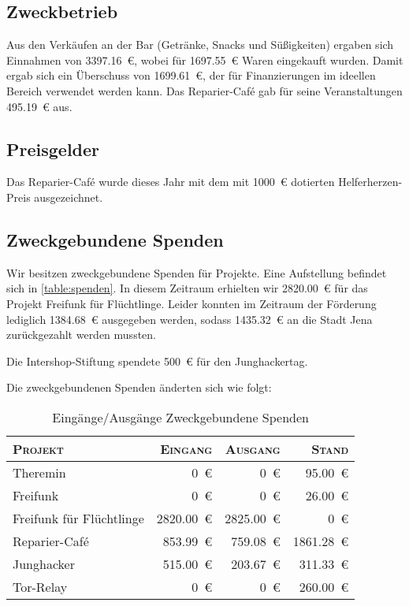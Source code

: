\documentclass[ngerman]{scrartcl}
\begin{document}
\subsection{Zweckbetrieb}
\label{sec:Zweckbetrieb}
Aus den Verkäufen an der Bar (Getränke, Snacks und Süßigkeiten) ergaben sich Einnahmen von \num{3397,16}~\euro{}, wobei für \num{1697,55}~\euro{} Waren eingekauft wurden.
Damit ergab sich ein Überschuss von \num{1699,61}~\euro{}, der für Finanzierungen im ideellen Bereich verwendet werden kann.
Das Reparier-Café gab für seine Veranstaltungen \num{495,19}~\euro{} aus.


\subsection{Preisgelder}
\label{sec:preisgelder}

Das Reparier-Café wurde dieses Jahr mit dem mit \num{1000}~\euro{} dotierten Helferherzen-Preis ausgezeichnet.

\subsection{Zweckgebundene Spenden}
\label{sec:zweckgebundene_spenden}
Wir besitzen zweckgebundene Spenden für Projekte. Eine Aufstellung befindet sich in \autoref{table:spenden}.
In diesem Zeitraum erhielten wir \num{2820,00}~\euro{} für das Projekt Freifunk für Flüchtlinge.
Leider konnten im Zeitraum der Förderung lediglich \num{1384,68}~\euro{} ausgegeben werden,
sodass \num{1435,32}~\euro{} an die Stadt Jena zurückgezahlt werden mussten.

Die Intershop-Stiftung spendete \num{500}~\euro{} für den Junghackertag.

Die zweckgebundenen Spenden änderten sich wie folgt:

\begin{table}[h]
	\centering
	\begin{tabular}{l|r|r|r}
	\toprule
	\textsc{Projekt} & \textsc{Eingang} & \textsc{Ausgang} & \textsc{Stand} \\
	\midrule
	Theremin & \num{0}~\euro{} & \num{0}~\euro{} & \num{95,00}~\euro{} \\
	Freifunk & \num{0}~\euro{} & \num{0}~\euro{} & \num{26,00}~\euro{} \\
	Freifunk für Flüchtlinge & \num{2820,00}~\euro{} & \num{2825,00}~\euro{} & \num{0}~\euro{} \\
	Reparier-Café & \num{853,99}~\euro{} & \num{759,08}~\euro{} & \num{1861,28}~\euro{} \\
	Junghacker & \num{515,00}~\euro{} & \num{203,67}~\euro{} & \num{311,33}~\euro{} \\
	Tor-Relay & \num{0}~\euro{} & \num{0}~\euro{} & \num{260,00}~\euro{} \\
\bottomrule
	\end{tabular}
	\caption{Eingänge/Ausgänge Zweckgebundene Spenden}
	\label{table:spenden}
\end{table}
\end{document}
